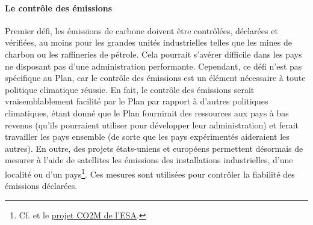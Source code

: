 \documentclass[a5paper,french,openany]{memoir}
\begin{document}
\paragraph{Le contrôle des émissions}
Premier défi, les émissions de carbone doivent être contrôlées, déclarées et vérifiées, au moins pour les grandes unités industrielles telles que les mines de charbon ou les raffineries de pétrole. Cela pourrait s'avérer difficile dans les pays ne disposant pas d'une administration performante. Cependant, ce défi n'est pas spécifique au Plan, car le contrôle des émissions est un élément nécessaire à toute politique climatique réussie. En fait, le contrôle des émissions serait vraisemblablement facilité par le Plan par rapport à d'autres politiques climatiques, étant donné que le Plan fournirait des ressources aux pays à bas revenus (qu'ils pourraient utiliser pour développer leur administration) et ferait travailler les pays ensemble (de sorte que les pays expérimentés aideraient les autres). En outre, des projets états-uniens et européens permettent désormais de mesurer à l'aide de satellites les émissions des installations industrielles, d'une localité ou d'un pays\footnote{Cf. \cite{nassar_quantifying_2017,pan_potential_2021,shen_national_2023} et le \href{https://www.esa.int/Applications/Observing_the_Earth/Copernicus/Carbon_dioxide_monitoring_satellite_given_the_shakes}{projet CO2M de l'ESA}.}. Ces mesures sont utilisées pour contrôler la fiabilité des émissions déclarées.
\end{document}

